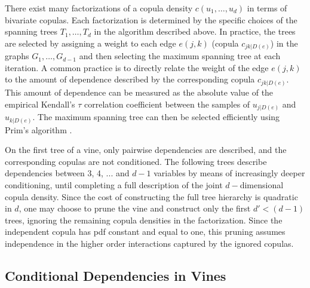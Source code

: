 \documentclass{article}
\begin{document}
There exist many factorizations of a copula density $c(u_1,\ldots,u_d)$ in
terms of bivariate copulas.  Each factorization is determined by the specific
choices of the spanning trees $T_1,\ldots,T_d$ in the algorithm described
above.  In practice, the trees are selected by assigning a weight to each edge
$e(j,k)$ (copula $c_{jk|D(e)}$) in the graphs $G_1,\ldots,G_{d-1}$ and then
selecting the maximum spanning tree at each iteration.  A common practice is to
directly relate the weight of the edge $e(j,k)$ to the amount of dependence
described by the corresponding copula $c_{jk|D(e)}$. This amount of dependence
can be measured as the absolute value of the empirical Kendall's $\tau$
correlation coefficient between the samples of $u_{j|D(e)}$ and
$u_{k|D(e)}$.  The maximum spanning tree can then be selected efficiently using
Prim's algorithm \cite{prim,rvines}.

On the first tree of a vine, only pairwise dependencies are described, and the
corresponding copulas are not conditioned. The following trees describe
dependencies between 3, 4, ... and $d-1$ variables by means of increasingly deeper
conditioning, until completing a full description of the
joint $d-$dimensional copula density.  Since the cost of constructing the full
tree hierarchy is quadratic in $d$, one may choose to prune the vine and
construct only the first $d' < (d-1)$ trees, ignoring the remaining copula
densities in the factorization. Since the independent copula has pdf constant
and equal to one, this pruning assumes independence in the higher order
interactions captured by the ignored copulas.

\subsection{Conditional Dependencies in Vines}
\end{document}
